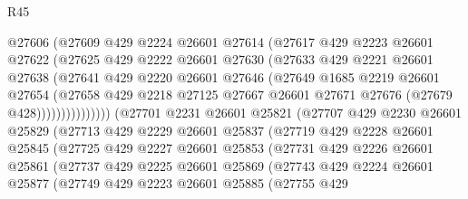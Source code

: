 \begin{lexlean}{R45}
\begin{coremodule}
                      @27606
                      (@27609
                        @429
                        @2224
                        @26601
                        @27614
                        (@27617
                          @429
                          @2223
                          @26601
                          @27622
                          (@27625
                            @429
                            @2222
                            @26601
                            @27630
                            (@27633
                              @429
                              @2221
                              @26601
                              @27638
                              (@27641
                                @429
                                @2220
                                @26601
                                @27646
                                (@27649
                                  @1685
                                  @2219
                                  @26601
                                  @27654
                                  (@27658
                                    @429
                                    @2218
                                    @27125
                                    @27667
                                    @26601
                                    @27671
                                    @27676
                                    (@27679 @428)))))))))))))))
        (@27701
          @2231
          @26601
          @25821
          (@27707
            @429
            @2230
            @26601
            @25829
            (@27713
              @429
              @2229
              @26601
              @25837
              (@27719
                @429
                @2228
                @26601
                @25845
                (@27725
                  @429
                  @2227
                  @26601
                  @25853
                  (@27731
                    @429
                    @2226
                    @26601
                    @25861
                    (@27737
                      @429
                      @2225
                      @26601
                      @25869
                      (@27743
                        @429
                        @2224
                        @26601
                        @25877
                        (@27749
                          @429
                          @2223
                          @26601
                          @25885
                          (@27755
                            @429

\end{coremodule}
\end{lexlean}
